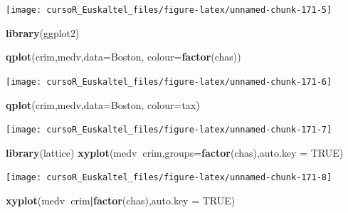 \documentclass[]{book}
\newenvironment{Shaded}{\begin{snugshade}}{\end{snugshade}}
\newcommand{\KeywordTok}[1]{\textcolor[rgb]{0.13,0.29,0.53}{\textbf{#1}}}
\newcommand{\DataTypeTok}[1]{\textcolor[rgb]{0.13,0.29,0.53}{#1}}
\newcommand{\OtherTok}[1]{\textcolor[rgb]{0.56,0.35,0.01}{#1}}
\newcommand{\OperatorTok}[1]{\textcolor[rgb]{0.81,0.36,0.00}{\textbf{#1}}}
\newcommand{\NormalTok}[1]{#1}
\begin{document}
\begin{center}\texttt{[image: cursoR\_Euskaltel\_files/figure-latex/unnamed-chunk-171-5]} \end{center}

\begin{Shaded}
\begin{Highlighting}[]
\KeywordTok{library}\NormalTok{(ggplot2)}

\KeywordTok{qplot}\NormalTok{(crim,medv,}\DataTypeTok{data=}\NormalTok{Boston, }\DataTypeTok{colour=}\KeywordTok{factor}\NormalTok{(chas))}
\end{Highlighting}
\end{Shaded}

\begin{center}\texttt{[image: cursoR\_Euskaltel\_files/figure-latex/unnamed-chunk-171-6]} \end{center}

\begin{Shaded}
\begin{Highlighting}[]
\KeywordTok{qplot}\NormalTok{(crim,medv,}\DataTypeTok{data=}\NormalTok{Boston, }\DataTypeTok{colour=}\NormalTok{tax)}
\end{Highlighting}
\end{Shaded}

\begin{center}\texttt{[image: cursoR\_Euskaltel\_files/figure-latex/unnamed-chunk-171-7]} \end{center}

\begin{Shaded}
\begin{Highlighting}[]
\KeywordTok{library}\NormalTok{(lattice)}
\KeywordTok{xyplot}\NormalTok{(medv}\OperatorTok{~}\NormalTok{crim,}\DataTypeTok{groups=}\KeywordTok{factor}\NormalTok{(chas),}\DataTypeTok{auto.key =} \OtherTok{TRUE}\NormalTok{)}
\end{Highlighting}
\end{Shaded}

\begin{center}\texttt{[image: cursoR\_Euskaltel\_files/figure-latex/unnamed-chunk-171-8]} \end{center}

\begin{Shaded}
\begin{Highlighting}[]
\KeywordTok{xyplot}\NormalTok{(medv}\OperatorTok{~}\NormalTok{crim}\OperatorTok{|}\KeywordTok{factor}\NormalTok{(chas),}\DataTypeTok{auto.key =} \OtherTok{TRUE}\NormalTok{)}
\end{Highlighting}
\end{Shaded}
\end{document}
